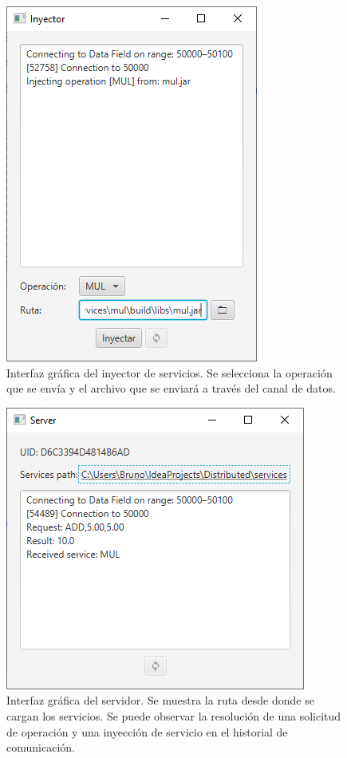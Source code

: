 \documentclass[conference,compsoc]{IEEEtran}
\begin{document}
\begin{figure}[htb]
    \centering
    \includegraphics[width=0.7\columnwidth]{injectorfx.png}
    \caption{Interfaz gráfica del inyector de servicios. Se selecciona la operación que se envía y el archivo que se enviará a través del canal de datos.}
    \label{fig:injector}
\end{figure}

\begin{figure}[htb]
    \centering
    \includegraphics[width=0.7\columnwidth]{serverfx.png}
    \caption{Interfaz gráfica del servidor. Se muestra la ruta desde donde se cargan los servicios. Se puede observar la resolución de una solicitud de operación y una inyección de servicio en el historial de comunicación.}
    \label{fig:server}
\end{figure}
\end{document}
